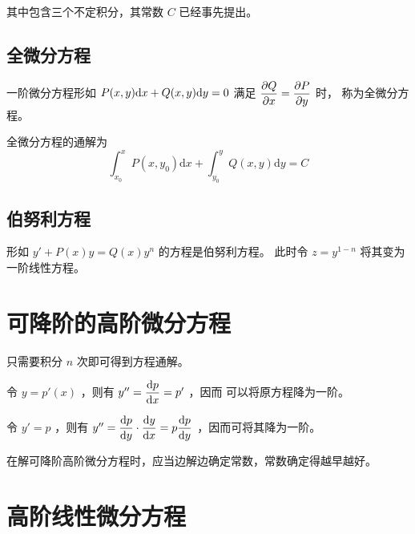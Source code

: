 其中包含三个不定积分，其常数 $ C $ 已经事先提出。

\subsection{全微分方程}

一阶微分方程形如 $ \displaystyle P(x,y)\mathrm{d}x + Q(x,y)\mathrm{d}y = 0 $ 满足
$ \displaystyle \dfrac{\partial Q}{\partial x} = \dfrac{\partial P}{\partial y} $ 时，
称为全微分方程。

全微分方程的通解为$$
    \int_{x_0}^xP(x,y_0)\mathrm{d}x + \int_{y_0}^y Q(x,y)\mathrm{d}y = C
$$ 

\subsection{伯努利方程}

形如 $ y' + P(x)y = Q(x)y^n $ 的方程是伯努利方程。
此时令 $ z = y^{1-n} $ 将其变为一阶线性方程。

\section{可降阶的高阶微分方程}

\begin{Field}[形如 $ y^{(n)} = f(x) $ 时 ]

    只需要积分 $ n $ 次即可得到方程通解。
\end{Field}

\begin{Field}[不显含函数$ y $ 的二阶可降阶方程 $ y^\pprime = f(x,y') $ ]

    令 $ y = p'(x) $ ，则有 $ y^{\prime\prime} = \dfrac{\mathrm{d} p}{\mathrm{d}x}  =p' $ ，因而
    可以将原方程降为一阶。
\end{Field}

\begin{Field}[不显含自变量 $ x $ 的二阶可降阶方程 $  y^\pprime = f(y,y') $ ]

    令 $ y' = p $ ，则有 $ y^{\prime\prime} = \dfrac{\mathrm{d}p}{\mathrm{d}y}\cdot \dfrac{\mathrm{d}y}{\mathrm{d}x}
    =p\dfrac{\mathrm{d}p}{\mathrm{d}y} $ ，因而可将其降为一阶。
\end{Field}

在解可降阶高阶微分方程时，应当边解边确定常数，常数确定得越早越好。

\section{高阶线性微分方程}

